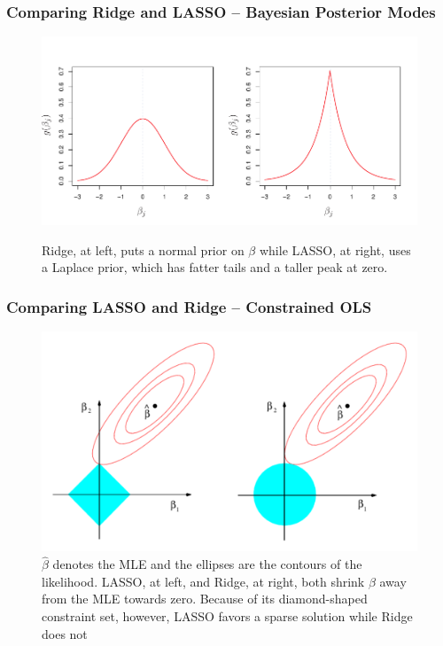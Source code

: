 \begin{frame}
  \frametitle{Comparing Ridge and LASSO -- Bayesian Posterior Modes}
    
\begin{figure}
	\centering
	\includegraphics[scale=0.65]{../img/ISLR_ch6_fig11}
	\label{fig:ridge_lasso_prior}
  \caption{Ridge, at left, puts a normal prior on $\beta$ while LASSO, at right, uses a Laplace prior, which has fatter tails and a taller peak at zero.}
\end{figure}

\end{frame}
\begin{frame}
  \frametitle{Comparing LASSO and Ridge -- Constrained OLS}
  
\begin{figure}
	\centering
	\includegraphics[scale=0.43]{../img/ISLR_ch6_fig7}
	\caption{$\widehat{\beta}$ denotes the MLE and the ellipses are the contours of the likelihood. 
LASSO, at left, and Ridge, at right, both shrink $\beta$ away from the MLE towards zero.
Because of its diamond-shaped constraint set, however, LASSO favors a \alert{sparse solution} while Ridge does not}
	\label{fig:ridge_lasso_constraint}
\end{figure}
\end{frame}
